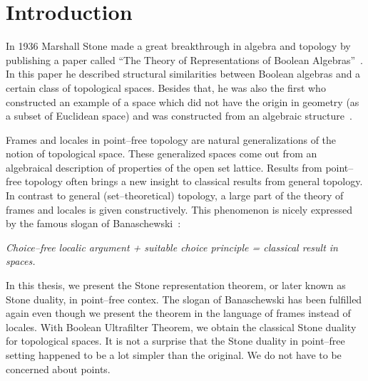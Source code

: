 \chapter{Introduction}

In 1936 Marshall Stone made a great breakthrough in algebra and topology by publishing a paper called ``The Theory of Representations of Boolean Algebras''~\cite{stone1936theory}.
In this paper he described structural similarities between Boolean algebras and a certain class of topological spaces.
Besides that, he was also the first who constructed an example of a space which did not have the origin in geometry (as a subset of Euclidean space) and was constructed from an algebraic structure~\cite{johnstone1986stone}.


Frames and locales in point--free topology are natural generalizations of the notion of topological space.
These generalized spaces come out from an algebraical description of properties of the open set lattice.
Results from point--free topology often brings a new insight to classical results from general topology.
In contrast to general (set--theoretical) topology, a large part of the theory of frames and locales is given constructively.
This phenomenon is nicely expressed by the famous slogan of Banaschewski~\cite{banaschewski1990proving}:
\begin{center}\em
    Choice--free localic argument + suitable choice principle = classical result in spaces.
\end{center}


In this thesis, we present the Stone representation theorem, or later known as Stone duality, in point--free contex.
The slogan of Banaschewski has been fulfilled again even though we present the theorem in the language of frames instead of locales.
With Boolean Ultrafilter Theorem, we obtain the classical Stone duality for topological spaces.
It is not a surprise that the Stone duality in point--free setting happened to be a lot simpler than the original.
We do not have to be concerned about points.

